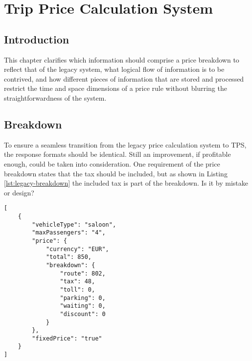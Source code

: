 \graphicspath{{Chapter4/Figs/Vector/}{Chapter4/Figs/}}

%
\chapter{Trip Price Calculation System}
\section{Introduction}
This chapter clarifies which information should comprise a price breakdown to reflect that of the legacy system, what logical flow of information is to be contrived, and how different pieces of information that are stored and processed restrict the time and space dimensions of a price rule without blurring the straightforwardness of the system.

%
\section{Breakdown}
To ensure a seamless transition from the legacy price calculation system to TPS, the response formats should be identical. Still an improvement, if profitable enough, could be taken into consideration. One requirement of the price breakdown states that the tax should be included, but as shown in Listing \ref{lst:legacy-breakdown} the included tax is part of the breakdown. Is it by mistake or design?

\noindent\begin{minipage}{.45\textwidth}
\begin{lstlisting}[caption={Legacy price breakdown}, label={lst:legacy-breakdown}]
[
	{
		"vehicleType": "saloon",
		"maxPassengers": "4",
		"price": {
			"currency": "EUR",
			"total": 850,
			"breakdown": {
				"route": 802,
				"tax": 48,
				"toll": 0,
				"parking": 0,
				"waiting": 0,
				"discount": 0
			}
		},
		"fixedPrice": "true"
	}
]
\end{lstlisting}
\end{minipage}

